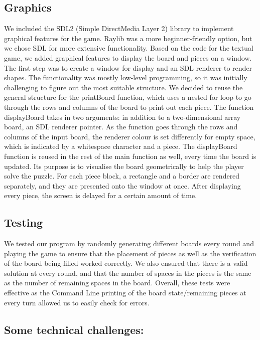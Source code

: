 \documentclass{article}
\begin{document}
\subsection{Graphics}

We included the SDL2 (Simple DirectMedia Layer 2) library to implement graphical features for the game. Raylib was a more beginner-friendly option, but we chose SDL for more extensive functionality. Based on the code for the textual game, we added graphical features to display the board and pieces on a window. The first step was to create a window for display and an SDL renderer to render shapes. The functionality was mostly low-level programming, so it was initially challenging to figure out the most suitable structure. We decided to reuse the general structure for the printBoard function, which uses a nested for loop to go through the rows and columns of the board to print out each piece. The function displayBoard takes in two arguments: in addition to a two-dimensional array board, an SDL renderer pointer. As the function goes through the rows and columns of the input board, the renderer colour is set differently for empty space, which is indicated by a whitespace character and a piece. The displayBoard function is reused in the rest of the main function as well, every time the board is updated. Its purpose is to visualise the board geometrically to help the player solve the puzzle. For each piece block, a rectangle and a border are rendered separately, and they are presented onto the window at once. After displaying every piece, the screen is delayed for a certain amount of time.

\subsection{Testing}

We tested our program by randomly generating different boards every round and playing the game to ensure that the placement of pieces as well as the verification of the board being filled worked correctly. We also ensured that there is a valid solution at every round, and that the number of spaces in the pieces is the same as the number of remaining spaces in the board. Overall, these tests were effective as the Command Line printing of the board state/remaining pieces at every turn allowed us to easily check for errors.

\subsection{Some technical challenges:}
\end{document}

